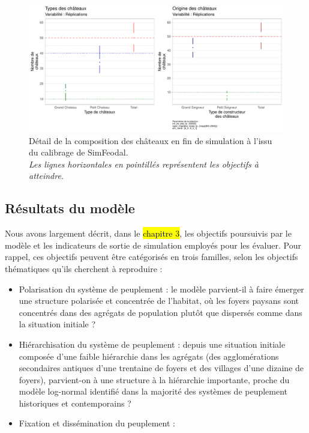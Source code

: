 \begin{figure}[H]
	\centering
	\includegraphics[width=\linewidth]{img/Chateaux_Types_condenses.pdf}
	\caption{Détail de la composition des châteaux en fin de simulation à l'issu du calibrage de SimFeodal.\\
	\textit{Les lignes horizontales en pointillés représentent les objectifs à atteindre.}}
	\label{fig:calibrage-chateaux-composition}
\end{figure}


\clearpage
\subsection{Résultats du modèle}

Nous avons largement décrit, dans le \hl{chapitre 3}, les objectifs poursuivis par le modèle et les indicateurs de sortie de simulation employés pour les évaluer.
Pour rappel, ces objectifs peuvent être catégorisés en trois familles, selon les objectifs thématiques qu'ils cherchent à reproduire : 
\begin{itemize}
	\item Polarisation du système de peuplement : le modèle parvient-il à faire émerger une structure polarisée et concentrée de l'habitat, où les foyers paysans sont concentrés dans des agrégats de population plutôt que dispersés comme dans la situation initiale ?
	\item Hiérarchisation du système de peuplement : depuis une situation initiale composée d'une faible hiérarchie dans les agrégats (des \og agglomérations secondaires antiques\fg{} d'une trentaine de foyers et des \og villages\fg{} d'une dizaine de foyers), parvient-on à une structure à la hiérarchie importante, proche du modèle log-normal identifié dans la majorité des systèmes de peuplement historiques et contemporains ?
	\item Fixation et dissémination du peuplement : 
\end{itemize}

